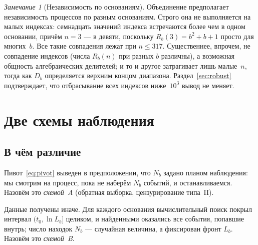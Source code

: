\documentclass[11pt,a4paper]{article}
\theoremstyle{plain}
\theoremstyle{remark}
\newtheorem{remark}{Замечание}
\newcommand{\Rb}{R_b}
\begin{document}
\begin{remark}[Независимость по основаниям]
Объединение предполагает независимость процессов по разным основаниям. Строго она не
выполняется на малых индексах: семнадцать значений индекса встречаются более чем в одном
основании, причём $n=3$ --- в девяти, поскольку $\Rb(3)=b^2+b+1$ просто для многих~$b$.
Все такие совпадения лежат при $n\le317$. Существеннее, впрочем, не совпадение индексов
(числа $\Rb(n)$ при разных $b$ различны), а возможная общность алгебраических делителей;
и то и другое затрагивает лишь малые~$n$, тогда как $D_b$ определяется верхним концом
диапазона. Раздел~\ref{sec:robust} подтверждает, что отбрасывание всех индексов ниже~$10^3$
вывод не меняет.
\end{remark}

\section{Две схемы наблюдения}\label{sec:scheme}

\subsection{В чём различие}

Пивот~\eqref{eq:pivot} выведен в предположении, что $N_b$ задано планом наблюдения:
мы смотрим на процесс, пока не наберём $N_b$ событий, и останавливаемся. Назовём это
\emph{схемой~A} (обратная выборка, цензурирование типа~II).

Данные получены иначе. Для каждого основания вычислительный поиск покрыл интервал
$(t_0,\ln L_b]$ целиком, и найденными оказались все события, попавшие внутрь; число
находок $N_b$ --- случайная величина, а фиксирован фронт $L_b$. Назовём это
\emph{схемой~B}.
\end{document}
